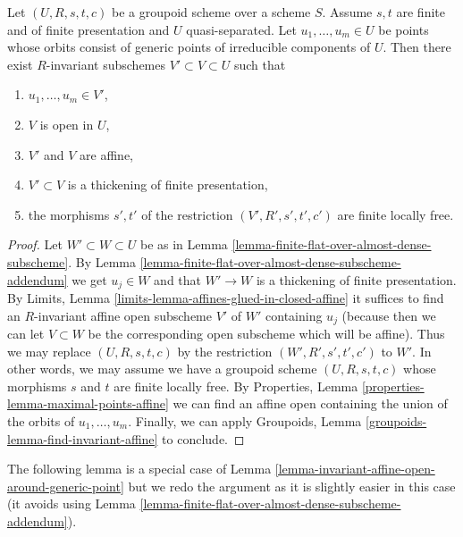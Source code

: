 \begin{lemma}
\label{lemma-invariant-affine-open-around-generic-point}
Let $(U, R, s, t, c)$ be a groupoid scheme over a scheme $S$. Assume $s, t$
are finite and of finite presentation and $U$ quasi-separated. Let
$u_1, \ldots, u_m \in U$ be points whose orbits consist of generic points
of irreducible components of $U$. Then there exist $R$-invariant subschemes
$V' \subset V \subset U$ such that
\begin{enumerate}
\item $u_1, \ldots, u_m \in V'$,
\item $V$ is open in $U$,
\item $V'$ and $V$ are affine,
\item $V' \subset V$ is a thickening of finite presentation,
\item the morphisms $s', t'$ of the restriction $(V', R', s', t', c')$
are finite locally free.
\end{enumerate}
\end{lemma}

\begin{proof}
Let $W' \subset W \subset U$ be as in
Lemma \ref{lemma-finite-flat-over-almost-dense-subscheme}.
By Lemma \ref{lemma-finite-flat-over-almost-dense-subscheme-addendum}
we get $u_j \in W$ and that $W' \to W$ is a thickening of finite presentation.
By Limits, Lemma \ref{limits-lemma-affines-glued-in-closed-affine}
it suffices to find an $R$-invariant affine open subscheme
$V'$ of $W'$ containing $u_j$ (because then we can let $V \subset W$
be the corresponding open subscheme which will be affine).
Thus we may replace $(U, R, s, t, c)$ by the restriction
$(W', R', s', t', c')$ to $W'$.
In other words, we may assume we have a groupoid scheme $(U, R, s, t, c)$
whose morphisms $s$ and $t$ are finite locally free.
By Properties, Lemma \ref{properties-lemma-maximal-points-affine}
we can find an affine open containing the union of the orbits of
$u_1, \ldots, u_m$. Finally, we can apply
Groupoids, Lemma \ref{groupoids-lemma-find-invariant-affine}
to conclude.
\end{proof}

\noindent
The following lemma is a special case of
Lemma \ref{lemma-invariant-affine-open-around-generic-point}
but we redo the argument as it is slightly easier in this case
(it avoids using
Lemma \ref{lemma-finite-flat-over-almost-dense-subscheme-addendum}).

